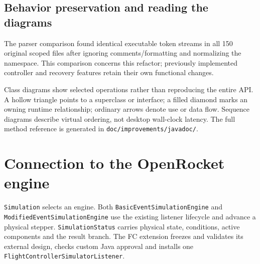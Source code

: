 \documentclass[10pt,letterpaper]{article}
\newcommand{\code}[1]{\nolinkurl{#1}}
\newcommand{\class}[1]{\nolinkurl{#1}}
\begin{document}
\subsection{Behavior preservation and reading the diagrams}
The parser comparison found identical executable token streams in all 150
original scoped files after ignoring comments/formatting and normalizing the
namespace. This comparison concerns this refactor; previously implemented
controller and recovery features retain their own functional changes.

Class diagrams show selected operations rather than reproducing the entire
API. A hollow triangle points to a superclass or interface; a filled diamond
marks an owning runtime relationship; ordinary arrows denote use or data flow.
Sequence diagrams describe virtual ordering, not desktop wall-clock latency.
The full method reference is generated in \code{doc/improvements/javadoc/}.

\clearpage
\section{Connection to the OpenRocket engine}
\class{Simulation} selects an engine. Both \class{BasicEventSimulationEngine}
and \class{ModifiedEventSimulationEngine} use the existing listener lifecycle
and advance a physical stepper. \class{SimulationStatus} carries physical state,
conditions, active components and the result branch. The FC extension freezes
and validates its external design, checks custom Java approval and installs
one \class{FlightControllerSimulatorListener}.
\end{document}
